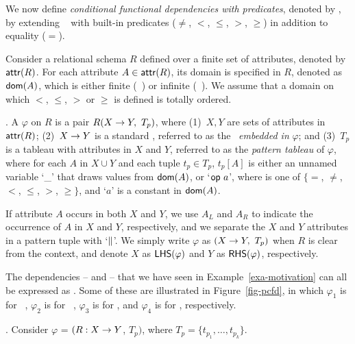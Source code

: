 We now define {\em conditional functional dependencies with predicates}, denoted by \pCFDs, 
by extending \CFDs~\cite{CFDs} with built-in
predicates ($\ne$, $<$, $\le$, $>$, $\ge$) in addition to equality ($=$).

Consider a relational schema $R$ defined over a finite set of
attributes, denoted by $\protect\mathsf{attr}(R)$. For each attribute $A \in
\protect\mathsf{attr}(R)$, its domain is specified in $R$, denoted as $\protect\mathsf{dom}(A)$,
which is either finite (\eg~)
or infinite (\eg~).
We assume \kwlog that a domain on which $<$, $\le$, $>$ or $\ge$ is defined is totally ordered.


. A \pCFD $\varphi$ on $R$ is a pair
$R(X\rightarrow Y,\ T_p)$, where (1)~$X, Y$ are sets of attributes in
$\protect\mathsf{attr}(R)$; (2)~$X \rightarrow Y$ is a standard \FD, referred to as the
\FD~{\em embedded in} $\varphi$; and (3)~$T_p$ is a tableau with
attributes in $X$ and $Y$, referred to as the {\em pattern tableau}
of $\varphi$, where for each $A$ in $X \cup Y$ and each tuple $t_p
\in T_p$, $t_p[A]$ is either an unnamed
variable `\_' that draws values from $\protect\mathsf{dom}(A)$, or
`$\op a$', where \op is one of $\{=$, $\ne$,
$<$, $\le$, $>$, $\ge\}$,  and `$a$' is a constant in $\protect\mathsf{dom}(A)$.

If attribute $A$
occurs in both $X$ and $Y$, we use $A_L$ and $A_R$ to indicate the
occurrence of $A$ in $X$ and $Y$, respectively, and we separate the $X$
and $Y$ attributes in a pattern tuple with `$\parallel$'.
We simply write $\varphi$ as $(X \rightarrow Y,\ T_p)$ when $R$ is clear from the
context, and denote $X$ as $\relax{{\ensuremath {\mathsf{LHS}}}}(\varphi)$ and $Y$ as
$\relax{{\ensuremath {\mathsf{RHS}}}}(\varphi)$, respectively.



\begin{example}
The dependencies -- and --
that we have seen in Example~\ref{exa-motivation} can all be expressed as \pCFDs.  Some of these \pCFDs
are illustrated in Figure~\ref{fig-pcfd}, in which $\varphi_1$ is for \FD\ ,
$\varphi_2$ is for \CFD\ , $\varphi_3$ is for ,
and $\varphi_4$ is for , respectively.
\end{example}
\vspace{-1ex}


. Consider \pCFD $\varphi$ =
$(R:X\rightarrow Y$, $T_p)$, where $T_p = \{t_{p_1}, \ldots, t_{p_k}\}$.


